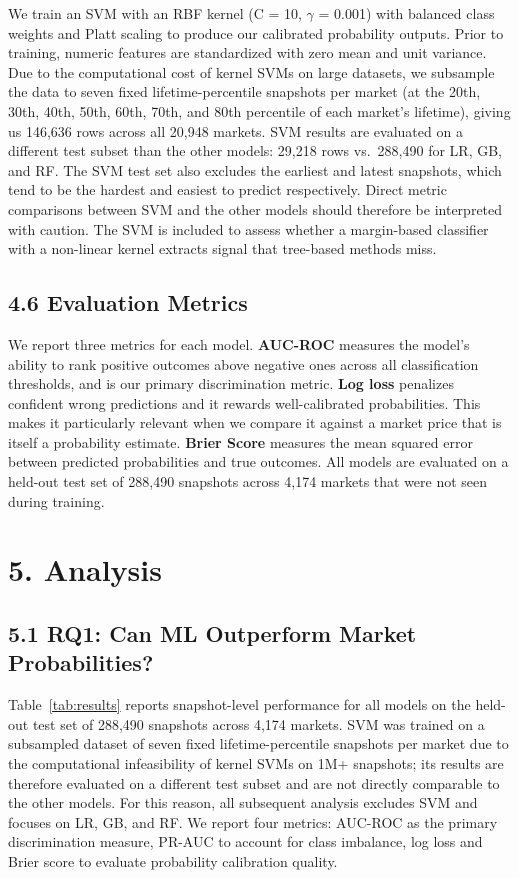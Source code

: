 \documentclass[11pt,twocolumn]{article}
\begin{document}
We train an SVM with an RBF kernel (C = 10, $\gamma$ = 0.001) with balanced class weights and Platt scaling to produce our calibrated probability outputs. Prior to training, numeric features are standardized with zero mean and unit variance. Due to the computational cost of kernel SVMs on large datasets, we subsample the data to seven fixed lifetime-percentile snapshots per market (at the 20th, 30th, 40th, 50th, 60th, 70th, and 80th percentile of each market's lifetime), giving us 146,636 rows across all 20,948 markets. SVM results are evaluated on a different test subset than the other models: 29,218 rows vs.\ 288,490 for LR, GB, and RF. The SVM test set also excludes the earliest and latest snapshots, which tend to be the hardest and easiest to predict respectively. Direct metric comparisons between SVM and the other models should therefore be interpreted with caution. The SVM is included to assess whether a margin-based classifier with a non-linear kernel extracts signal that tree-based methods miss.

\subsection*{4.6 Evaluation Metrics}

We report three metrics for each model.
\textbf{AUC-ROC} measures the model's ability to rank positive outcomes above negative ones across all classification thresholds, and is our primary discrimination metric.
\textbf{Log loss} penalizes confident wrong predictions and it rewards well-calibrated probabilities. This makes it particularly relevant when we compare it against a market price that is itself a probability estimate.
\textbf{Brier Score} measures the mean squared error between predicted probabilities and true outcomes. All models are evaluated on a held-out test set of 288,490 snapshots across 4,174 markets that were not seen during training.

\section*{5. Analysis}

\subsection*{5.1 RQ1: Can ML Outperform Market Probabilities?}
  Table~\ref{tab:results} reports snapshot-level
   performance for all models on the
  held-out test set of 288,490 snapshots across
  4,174 markets. SVM was trained on a subsampled dataset of seven fixed lifetime-percentile snapshots per market due to the computational infeasibility of kernel SVMs on 1M+ snapshots; its results are therefore evaluated on a different test subset and are not directly comparable to the other models. For this reason, all subsequent analysis excludes SVM and focuses on LR, GB, and RF. We report four metrics: AUC-ROC as the primary discrimination measure, PR-AUC to account for class imbalance, log loss and Brier score to evaluate probability calibration quality.
\end{document}
